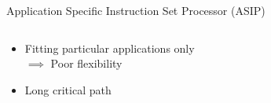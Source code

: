 \documentclass[handout]{beamer}
\begin{document}
\begin{CJK}{UTF8}{bkai}
\begin{frame}{Application Specific Instruction Set Processor (ASIP)}
\begin{columns}
\begin{column}{0.6\textwidth}
\begin{itemize}
{\begin{itemize}
                                    \item Fitting particular applications only \\ $\implies$ Poor flexibility
                                    \item Long critical path
                                \end{itemize}
                                }
                        \end{itemize} 
                    \end{column}
                \end{columns} 
            \end{frame}


\end{CJK}
\end{document}
